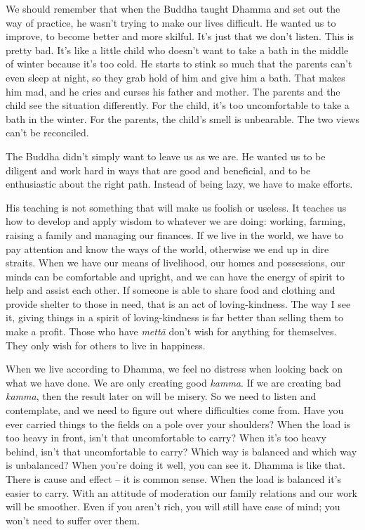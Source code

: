 We should remember that when the Buddha taught Dhamma and set out the
way of practice, he wasn't trying to make our lives difficult. He wanted
us to improve, to become better and more skilful. It's just that we
don't listen. This is pretty bad. It's like a little child who doesn't
want to take a bath in the middle of winter because it's too cold. He
starts to stink so much that the parents can't even sleep at night, so
they grab hold of him and give him a bath. That makes him mad, and he
cries and curses his father and mother. The parents and the child see
the situation differently. For the child, it's too uncomfortable to take
a bath in the winter. For the parents, the child's smell is unbearable.
The two views can't be reconciled.

The Buddha didn't simply want to leave us as we are. He wanted us to be
diligent and work hard in ways that are good and beneficial, and to be
enthusiastic about the right path. Instead of being lazy, we have to
make efforts.

His teaching is not something that will make us foolish or useless. It
teaches us how to develop and apply wisdom to whatever we are doing:
working, farming, raising a family and managing our finances. If we live
in the world, we have to pay attention and know the ways of the world,
otherwise we end up in dire straits. When we have our means of
livelihood, our homes and possessions, our minds can be comfortable and
upright, and we can have the energy of spirit to help and assist each
other. If someone is able to share food and clothing and provide shelter
to those in need, that is an act of loving-kindness. The way I see it,
giving things in a spirit of loving-kindness is far better than selling
them to make a profit. Those who have \emph{mettā} don't wish for
anything for themselves. They only wish for others to live in happiness.

When we live according to Dhamma, we feel no distress when looking back
on what we have done. We are only creating good \emph{kamma}. If we are
creating bad \emph{kamma}, then the result later on will be misery. So
we need to listen and contemplate, and we need to figure out where
difficulties come from. Have you ever carried things to the fields on a
pole over your shoulders? When the load is too heavy in front, isn't
that uncomfortable to carry? When it's too heavy behind, isn't that
uncomfortable to carry? Which way is balanced and which way is
unbalanced? When you're doing it well, you can see it. Dhamma is like
that. There is cause and effect -- it is common sense. When the load is
balanced it's easier to carry. With an attitude of moderation our family
relations and our work will be smoother. Even if you aren't rich, you
will still have ease of mind; you won't need to suffer over them.

